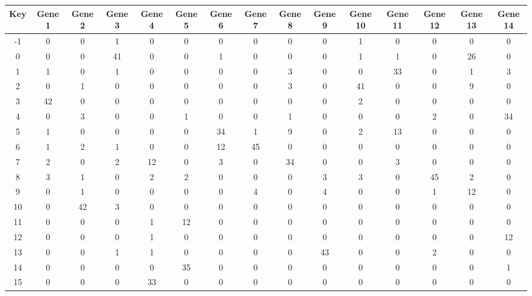 \begin{tabular}{|c|c|c|c|c|c|c|c|c|c|c|c|c|c|c|}
\hline
Key & Gene 1 & Gene 2 & Gene 3 & Gene 4 & Gene 5 & Gene 6 & Gene 7 & Gene 8 & Gene 9 & Gene 10 & Gene 11 & Gene 12 & Gene 13 & Gene 14 \\
\hline
-1 & 0 & 0 & 1 & 0 & 0 & 0 & 0 & 0 & 0 & 1 & 0 & 0 & 0 & 0 \\
0 & 0 & 0 & 41 & 0 & 0 & 1 & 0 & 0 & 0 & 1 & 1 & 0 & 26 & 0 \\
1 & 1 & 0 & 1 & 0 & 0 & 0 & 0 & 3 & 0 & 0 & 33 & 0 & 1 & 3 \\
2 & 0 & 1 & 0 & 0 & 0 & 0 & 0 & 3 & 0 & 41 & 0 & 0 & 9 & 0 \\
3 & 42 & 0 & 0 & 0 & 0 & 0 & 0 & 0 & 0 & 2 & 0 & 0 & 0 & 0 \\
4 & 0 & 3 & 0 & 0 & 1 & 0 & 0 & 1 & 0 & 0 & 0 & 2 & 0 & 34 \\
5 & 1 & 0 & 0 & 0 & 0 & 34 & 1 & 9 & 0 & 2 & 13 & 0 & 0 & 0 \\
6 & 1 & 2 & 1 & 0 & 0 & 12 & 45 & 0 & 0 & 0 & 0 & 0 & 0 & 0 \\
7 & 2 & 0 & 2 & 12 & 0 & 3 & 0 & 34 & 0 & 0 & 3 & 0 & 0 & 0 \\
8 & 3 & 1 & 0 & 2 & 2 & 0 & 0 & 0 & 3 & 3 & 0 & 45 & 2 & 0 \\
9 & 0 & 1 & 0 & 0 & 0 & 0 & 4 & 0 & 4 & 0 & 0 & 1 & 12 & 0 \\
10 & 0 & 42 & 3 & 0 & 0 & 0 & 0 & 0 & 0 & 0 & 0 & 0 & 0 & 0 \\
11 & 0 & 0 & 0 & 1 & 12 & 0 & 0 & 0 & 0 & 0 & 0 & 0 & 0 & 0 \\
12 & 0 & 0 & 0 & 1 & 0 & 0 & 0 & 0 & 0 & 0 & 0 & 0 & 0 & 12 \\
13 & 0 & 0 & 1 & 1 & 0 & 0 & 0 & 0 & 43 & 0 & 0 & 2 & 0 & 0 \\
14 & 0 & 0 & 0 & 0 & 35 & 0 & 0 & 0 & 0 & 0 & 0 & 0 & 0 & 1 \\
15 & 0 & 0 & 0 & 33 & 0 & 0 & 0 & 0 & 0 & 0 & 0 & 0 & 0 & 0 \\
\hline
\end{tabular}